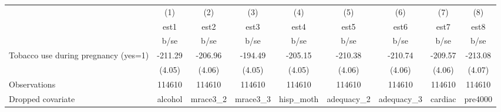{
\def\sym#1{\ifmmode^{#1}\else\(^{#1}\)\fi}
\begin{tabular}{l*{8}{c}}
\hline\hline
                                                  &\multicolumn{1}{c}{(1)}&\multicolumn{1}{c}{(2)}&\multicolumn{1}{c}{(3)}&\multicolumn{1}{c}{(4)}&\multicolumn{1}{c}{(5)}&\multicolumn{1}{c}{(6)}&\multicolumn{1}{c}{(7)}&\multicolumn{1}{c}{(8)}\\
                                                  &        est1&        est2&        est3&        est4&        est5&        est6&        est7&        est8\\
                                                  &        b/se&        b/se&        b/se&        b/se&        b/se&        b/se&        b/se&        b/se\\
\hline
Tobacco use during pregnancy (yes=1)              &     -211.29&     -206.96&     -194.49&     -205.15&     -210.38&     -210.74&     -209.57&     -213.08\\
                                                  &      (4.05)&      (4.06)&      (4.05)&      (4.05)&      (4.06)&      (4.06)&      (4.06)&      (4.07)\\
\hline
Observations                                      &      114610&      114610&      114610&      114610&      114610&      114610&      114610&      114610\\
Dropped covariate                                 &     alcohol&    mrace3\_2&    mrace3\_3&   hisp\_moth&  adequacy\_2&  adequacy\_3&     cardiac&     pre4000\\
\hline\hline
\end{tabular}
}
